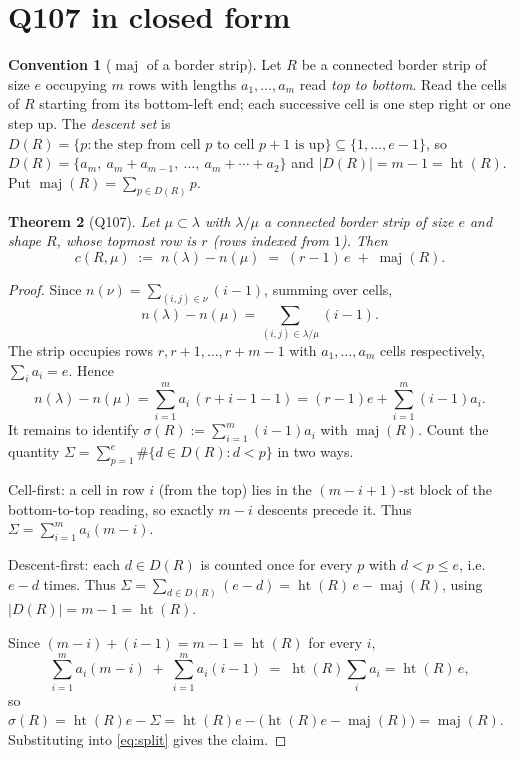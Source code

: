 \documentclass[11pt]{article}
\newtheorem{theorem}{Theorem}
\theoremstyle{definition}
\newtheorem{convention}[theorem]{Convention}
\DeclareMathOperator{\maj}{maj}
\newcommand{\hgt}{\operatorname{ht}}   %
\begin{document}
\section{Q107 in closed form}

\begin{convention}[$\maj$ of a border strip]\label{conv:maj}
Let $R$ be a connected border strip of size $e$ occupying $m$ rows with lengths
$a_1,\dots,a_m$ read \emph{top to bottom}.  Read the cells of $R$ starting from its
bottom-left end; each successive cell is one step right or one step up.  The
\emph{descent set} is $D(R)=\{p: \text{the step from cell }p\text{ to cell }p+1
\text{ is up}\}\subseteq\{1,\dots,e-1\}$, so
$D(R)=\{a_m,\ a_m+a_{m-1},\ \dots,\ a_m+\cdots+a_2\}$ and $|D(R)|=m-1=\hgt(R)$.
Put $\maj(R)=\sum_{p\in D(R)}p$.
\end{convention}

\begin{theorem}[Q107]\label{thm:A}
Let $\mu\subset\lambda$ with $\lambda/\mu$ a connected border strip of size $e$ and
shape $R$, whose topmost row is $r$ (rows indexed from $1$).  Then
\[
  \boxed{\ c(R,\mu)\;:=\;n(\lambda)-n(\mu)\;=\;(r-1)\,e\;+\;\maj(R).\ }
\]
\end{theorem}

\begin{proof}
Since $n(\nu)=\sum_{(i,j)\in\nu}(i-1)$, summing over cells,
\[
  n(\lambda)-n(\mu)=\sum_{(i,j)\in\lambda/\mu}(i-1).
\]
The strip occupies rows $r,r+1,\dots,r+m-1$ with $a_1,\dots,a_m$ cells respectively,
$\sum_i a_i=e$.  Hence
\begin{equation}\label{eq:split}
  n(\lambda)-n(\mu)=\sum_{i=1}^{m}a_i\,(r+i-1-1)=(r-1)e+\sum_{i=1}^{m}(i-1)a_i .
\end{equation}
It remains to identify $\sigma(R):=\sum_{i=1}^m(i-1)a_i$ with $\maj(R)$.  Count the
quantity $\Sigma=\sum_{p=1}^{e}\#\{d\in D(R):d<p\}$ in two ways.

Cell-first: a cell in row $i$ (from the top) lies in the $(m-i+1)$-st block of the
bottom-to-top reading, so exactly $m-i$ descents precede it.  Thus
$\Sigma=\sum_{i=1}^m a_i(m-i)$.

Descent-first: each $d\in D(R)$ is counted once for every $p$ with $d<p\le e$, i.e.\
$e-d$ times.  Thus $\Sigma=\sum_{d\in D(R)}(e-d)=\hgt(R)\,e-\maj(R)$, using
$|D(R)|=m-1=\hgt(R)$.

Since $(m-i)+(i-1)=m-1=\hgt(R)$ for every $i$,
\[
  \sum_{i=1}^m a_i(m-i)\;+\;\sum_{i=1}^m a_i(i-1)\;=\;\hgt(R)\sum_i a_i=\hgt(R)\,e,
\]
so $\sigma(R)=\hgt(R)e-\Sigma=\hgt(R)e-\bigl(\hgt(R)e-\maj(R)\bigr)=\maj(R)$.
Substituting into \eqref{eq:split} gives the claim.
\end{proof}
\end{document}
